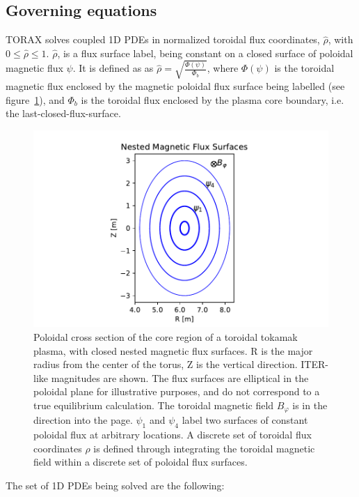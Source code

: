 \documentclass[aps, reprint, nofootinbib]{revtex4-2}
\newcommand{\rnorm}{\hat{\rho}}
\newcommand{\phib}{\Phi_b}
\begin{document}
\subsection{Governing equations}
\label{sec:equations}
TORAX solves coupled 1D PDEs in normalized toroidal flux coordinates,  $\rnorm$, with $0 \leq \rnorm \leq 1$. $\rnorm$, is a flux surface label, being constant on a closed surface of poloidal magnetic flux $\psi$. It is defined as as $\rnorm=\sqrt{\frac{\Phi(\psi)}{\phib}}$, where $\Phi(\psi)$ is the
toroidal magnetic flux enclosed by the magnetic poloidal flux surface being labelled (see figure~\ref{fig:flux_surfaces}), and $\phib$ is the toroidal flux enclosed by the plasma core boundary, i.e. the last-closed-flux-surface.

\begin{figure}[hbt]
    \includegraphics[width=1.0\linewidth]{figure1_flux.pdf}
    \caption{\footnotesize Poloidal cross section of the core region of a toroidal tokamak plasma, with closed nested magnetic flux surfaces. R is the major radius from the center of the torus, Z is the vertical direction. ITER-like magnitudes are shown. The flux surfaces are elliptical in the poloidal plane for illustrative purposes, and do not correspond to a true equilibrium calculation. The toroidal magnetic field $B_{\varphi}$ is in the direction into the page. $\psi_1$ and $\psi_4$ label two surfaces of constant poloidal flux at arbitrary locations. A discrete set of toroidal flux coordinates $\rho$ is defined through integrating the toroidal magnetic field within a discrete set of poloidal flux surfaces.}
    \label{fig:flux_surfaces}
\end{figure}

The set of 1D PDEs being solved are the following:
\end{document}
